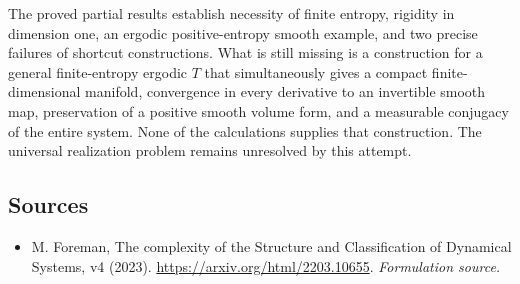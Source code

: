\documentclass[11pt]{article}
\begin{document}
The proved partial results establish necessity of finite entropy, rigidity in dimension one, an ergodic positive-entropy smooth example, and two precise failures of shortcut constructions. What is still missing is a construction for a general finite-entropy ergodic $T$ that simultaneously gives a compact finite-dimensional manifold, convergence in every derivative to an invertible smooth map, preservation of a positive smooth volume form, and a measurable conjugacy of the entire system. None of the calculations supplies that construction. The universal realization problem remains unresolved by this attempt.

\subsection{Sources}
\begin{itemize}
\item[S1]M. Foreman, The complexity of the Structure and Classification of Dynamical Systems, v4 (2023).
\url{https://arxiv.org/html/2203.10655}.
\textit{Formulation source.}
\end{itemize}
\end{document}
